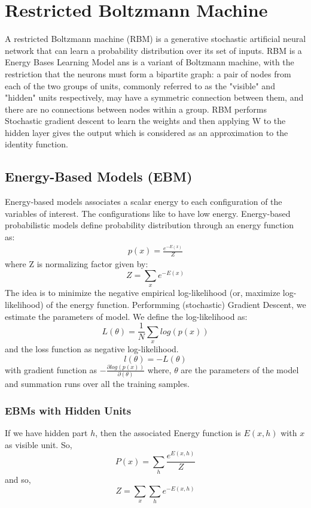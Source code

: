 \chapter{Restricted Boltzmann Machine}
A restricted Boltzmann machine (RBM) is a generative stochastic artificial neural network that can learn a probability distribution over its set of inputs.
RBM is a Energy Bases Learning Model ans is a variant of Boltzmann machine, with the restriction that the neurons must form a bipartite graph: a pair of nodes from each of the two groups of units, commonly referred to as the "visible" and "hidden" units respectively, may have a symmetric connection between them, and there are no connections between nodes within a group. RBM performs Stochastic gradient descent to learn the weights and then applying W to the hidden layer gives the output which is considered as an approximation to the identity function.

\section{Energy-Based Models (EBM)}
Energy-based models associates a scalar energy to each configuration of the variables of interest. The configurations like to have low energy. Energy-based probabilistic models define probability distribution through an energy function as:
\begin{eqnarray}
p(x) = \frac{e^{-E(x)}}{Z}
\end{eqnarray}
where Z is normalizing factor given by:\\
$$Z = \sum_x e^{-E(x)}$$
The idea is to minimize the negative empirical log-likelihood (or, maximize log-likelihood) of the energy function. Performming (stochastic) Gradient Descent, we estimate the parameters of model.
We define the log-likelihood as:\\
$$L(\theta) = \frac{1}{N}\sum_x log(p(x))$$
and the loss function as negative log-likelihood.\\
$$l(\theta) = -L(\theta)$$
with gradient function as $-\frac{\partial log(p(x))}{\partial(\theta)}$
where, $\theta$ are the parameters of the model and summation runs over all the training samples.
\subsection{EBMs with Hidden Units}
If we have hidden part $h$, then the associated Energy function is $E(x,h)$ with $x$ as visible unit.
So,\\
$$P(x) = \sum_h \frac{e^{E(x,h)}}{Z}$$
and so, $$Z = \sum_x \sum_h e^{-E(x,h)}$$

